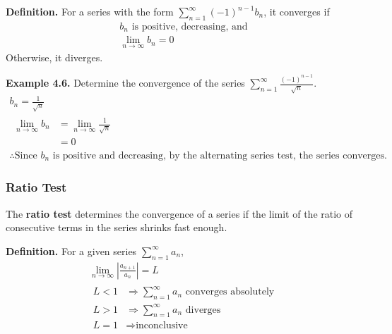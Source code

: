 \documentclass[12pt]{article}
\begin{document}
\textbf{Definition.} For a series with the form $\displaystyle\sum_{n=1}^{\infty}(-1)^{n-1}b_n$, it converges if
\begin{gather*}
	b_n \text{ is positive, decreasing, and} \\
	\displaystyle\lim_{n\rightarrow\infty}b_n = 0
\end{gather*}
Otherwise, it diverges.

\textbf{Example 4.6.} Determine the convergence of the series $\displaystyle\sum_{n=1}^{\infty}\frac{(-1)^{n-1}}{\sqrt{n}}$.
\begin{gather*}
	b_n = \frac{1}{\sqrt{n}}    \\
	\begin{aligned}
		\displaystyle\lim_{n\rightarrow\infty}b_n & = \displaystyle\lim_{n\rightarrow\infty}\frac{1}{\sqrt{n}} \\
		                                          & = 0
	\end{aligned} \\
	\therefore \text{Since } b_n \text{ is positive and decreasing, by the alternating series test, the series converges.}
\end{gather*}

\subsubsection{Ratio Test}

The \textbf{ratio test} determines the convergence of a series if the limit of the ratio of consecutive terms in the series shrinks fast enough.

\textbf{Definition.} For a given series $\displaystyle\sum_{n=1}^{\infty}a_n$,
\begin{gather*}
	\displaystyle\lim_{n\rightarrow\infty}|\frac{a_{n+1}}{a_n}| = L   \\
	\begin{aligned}
		L < 1 & \Rightarrow \displaystyle\sum_{n=1}^{\infty}a_n \text{ converges absolutely} \\
		L > 1 & \Rightarrow \displaystyle\sum_{n=1}^{\infty}a_n \text{ diverges}             \\
		L = 1 & \Rightarrow \text{inconclusive}                                              \\
	\end{aligned}
\end{gather*}
\end{document}
